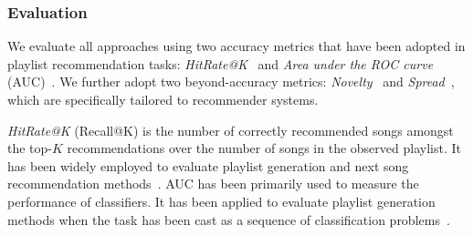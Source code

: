 \begin{itemize}
\end{itemize}


\subsubsection{Evaluation}

We evaluate %
all approaches using two accuracy metrics that have been adopted 
in playlist recommendation tasks:
\emph{HitRate@K}~\cite{hariri2012context} and \emph{Area under the ROC curve} (AUC)~\cite{manning2008introIR}.
We further adopt two beyond-accuracy metrics: %
\emph{Novelty}~\cite{zhang2012auralist,schedl2017} and \emph{Spread}~\cite{kluver2014evaluating},
which are specifically tailored to recommender systems.
%

\emph{HitRate@K} (\ie Recall@K) 
is the number of correctly recommended songs amongst the top-$K$ recommendations over
the number of songs in the %
observed playlist.
It has been widely employed to evaluate %
playlist generation and next song recommendation
methods~\cite{hariri2012context,bonnin2013evaluating,bonnin2015automated,jannach2015beyond}.
%
AUC has been primarily used to measure the performance of classifiers.
It has been applied to evaluate %
playlist generation methods when the task
has been cast as a sequence of classification problems~\cite{ben2017groove}.

